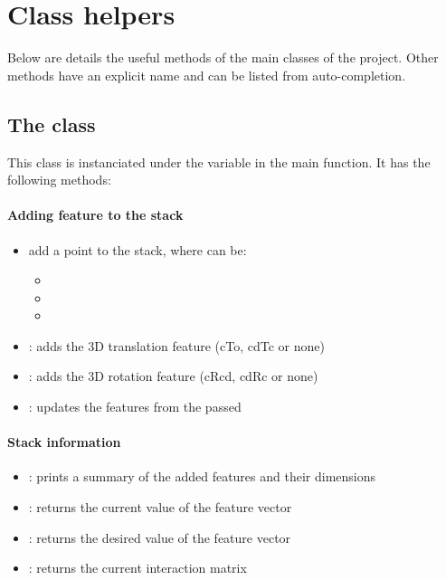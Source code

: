 \documentclass{ecnreport}
\begin{document}
\newpage
\appendix

\section{Class helpers}

Below are details the useful methods of the main classes of the project. Other methods have an explicit name and can be listed from auto-completion.

\subsection{The  class}\label{app:stack}

This class is instanciated under the variable  in the main function. It has the following methods:
\paragraph{Adding feature to the stack}
\begin{itemize}
 \item  {}
 add a point to the stack, where  can be:
 \begin{itemize}
  \item {}
  \item {}
  \item {}
 \end{itemize}
  \item  {}: adds the 3D translation feature (cTo, cdTc or none)
  \item  {}: adds the 3D rotation feature (cRcd, cdRc or none)
  \item  {}: updates the features from the passed 
\end{itemize}

\paragraph{Stack information}
\begin{itemize}
 \item  {}: prints a summary of the added features and their dimensions
 \item  {}: returns the current value of the feature vector
  \item  {}: returns the desired value of the feature vector
   \item  {}: returns the current interaction matrix
 \end{itemize}
\end{document}
